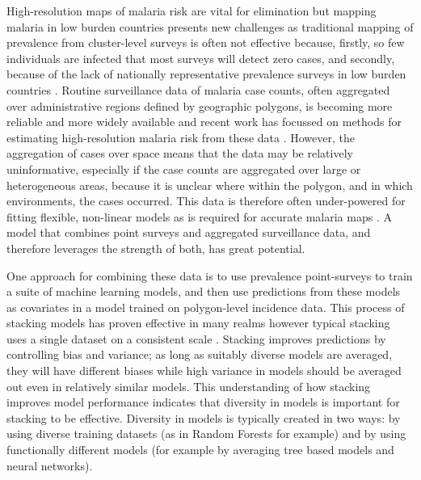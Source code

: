 \documentclass[11pt]{article}
\begin{document}
High-resolution maps of malaria risk are vital for elimination but mapping malaria in low burden countries presents new challenges as traditional mapping of prevalence from cluster-level surveys \citep{gething2011new, bhatt2017improved, gething2012long, bhatt2015effect} is often not effective  because, firstly, so few individuals are infected that most surveys will detect zero cases, and secondly, because of the lack of nationally representative prevalence surveys in low burden countries \citep{sturrock2016mapping, sturrock2014fine}. 
Routine surveillance data of malaria case counts, often aggregated over administrative regions defined by geographic polygons, is becoming more reliable and more widely available \citep{sturrock2016mapping} and recent work has focussed on methods for estimating high-resolution malaria risk from these data \citep{sturrock2014fine, wilson2017pointless, law2018variational, taylor2017continuous, li2012log}. 
However, the aggregation of cases over space means that the data may be relatively uninformative, especially if the case counts are aggregated over large or heterogeneous areas, because it is unclear where within the polygon, and in which environments, the cases occurred. 
This data is therefore often under-powered for fitting flexible, non-linear models as is required for accurate malaria maps \citep{bhatt2017improved, bhatt2015effect}. 
A model that combines point surveys and aggregated surveillance data, and therefore leverages the strength of both, has great potential.
 
One approach for combining these data is to use prevalence point-surveys to train a suite of machine learning models, and then use predictions from these models as covariates in a model trained on polygon-level incidence data. 
This process of stacking models has proven effective in many realms however typical stacking uses a single dataset on a consistent scale \citep{sill2009feature, bhatt2017improved}. 
Stacking improves predictions by controlling bias and variance; as long as suitably diverse models are averaged, they will have different biases while high variance in models should be averaged out even in relatively similar models.
This understanding of how stacking improves model performance indicates that diversity in models is important for stacking to be effective.
Diversity in models is typically created in two ways: by using diverse training datasets (as in Random Forests for example) and by using functionally different models (for example by averaging tree based models and neural networks).
\end{document}
